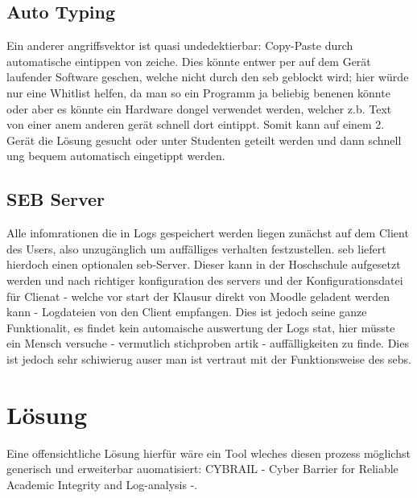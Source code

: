 \subsection{Auto Typing}
Ein anderer angriffsvektor ist quasi undedektierbar: Copy-Paste durch automatische eintippen von zeiche.
Dies könnte entwer per auf dem Gerät laufender Software geschen, welche nicht durch den \gls{seb} geblockt wird; hier würde nur eine Whitlist helfen, da man so ein Programm ja beliebig benenen könnte
oder aber es könnte ein Hardware dongel verwendet werden, welcher z.b. Text von einer anem anderen gerät schnell dort eintippt.
Somit kann auf einem 2. Gerät die Lösung gesucht oder unter Studenten geteilt werden und dann schnell ung bequem automatisch eingetippt werden.

\subsection{SEB Server}
Alle infomrationen die in Logs gespeichert werden liegen zunächst auf dem Client des Users, also unzugänglich um auffälliges verhalten festzustellen.
\gls{seb} liefert hierdoch einen optionalen \gls{seb}-Server.
Dieser kann in der Hoschschule aufgesetzt werden und nach richtiger konfiguration des servers und der Konfigurationsdatei für Clienat - welche vor start der Klausur direkt von Moodle geladent werden kann -
Logdateien von den Client empfangen.
Dies ist jedoch seine ganze Funktionalit, es findet kein automaische auswertung der Logs stat, hier müsste ein Mensch versuche - vermutlich stichproben artik - auffälligkeiten zu finde.
Dies ist jedoch sehr schiwierug auser man ist vertraut mit der Funktionsweise des \gls{seb}s.

\section{Lösung}
Eine offensichtliche Lösung hierfür wäre ein Tool wleches diesen prozess möglichst generisch und erweiterbar auomatisiert: CYBRAIL - Cyber Barrier for Reliable Academic Integrity and Log-analysis -.
